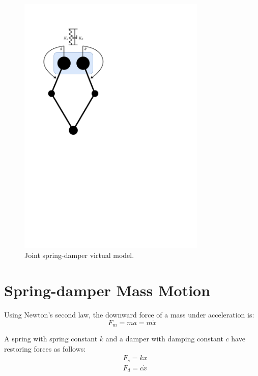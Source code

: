 \begin{figure}
\centering
\includegraphics[clip, trim=2cm 12cm 10cm 2cm, page = 1, width=0.8\textwidth]{images/geometry/joint-spring-damper} 
\caption{Joint spring-damper virtual model.}
\label{fig:Joint spring-damper virtual model}
\end{figure}

\section{Spring-damper Mass Motion}
\label{sec:Spring-damper Mass Motion}
Using Newton's second law, the downward force of a mass under acceleration is:
\begin{equation}
F_m = ma = m\ddot{x}
\end{equation}

A spring with spring constant $k$ and a damper with damping constant $c$ have restoring forces as follows:
\begin{equation}
\begin{aligned}
&F_s = kx \\
&F_d = c\dot{x}
\end{aligned}
\end{equation}

